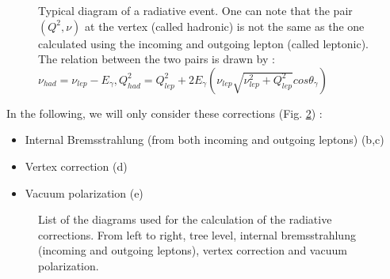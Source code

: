 \begin{figure}[htb]
\centering
{}
\caption{Typical diagram of a radiative event. One can note that the pair $(Q^2,\nu)$ at the vertex (called hadronic) is not the same as the one calculated using the incoming and outgoing lepton (called leptonic). The relation between the two pairs is drawn by : $\nu_{had} = \nu_{lep} - E_\gamma, Q^2_{had}=Q^2_{lep}+2E_\gamma(\nu_{lep} \sqrt{\nu_{lep}^2+Q^2_{lep}}cos\theta_\gamma)$}
\label{fig:rad_evt}
\end{figure}


In the following, we will only consider these corrections (Fig. \ref{fig:rad_dia}) :
\begin{itemize}
\item Internal Bremsstrahlung (from both incoming and outgoing leptons) (b,c)
\item Vertex correction (d)
\item Vacuum polarization (e)
\end{itemize}

\begin{figure}[htb]
\centerline{}
\caption{List of the diagrams used for the calculation of the radiative corrections. From left to right, tree level, internal bremsstrahlung (incoming and outgoing leptons), vertex correction and vacuum polarization.}\label{fig:rad_dia}
\end{figure}

